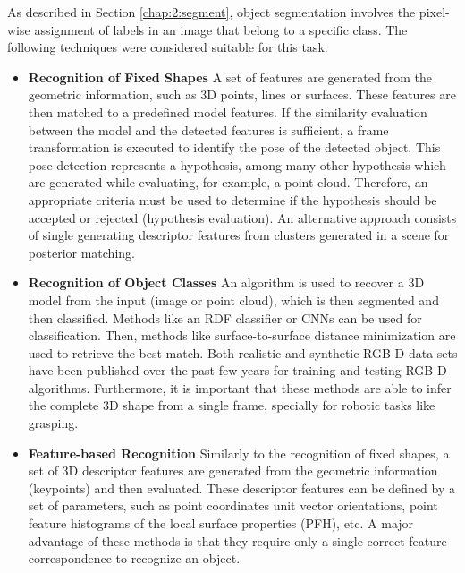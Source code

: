As described in Section \ref{chap:2:segment}, object segmentation involves the pixel-wise assignment of labels in an image that belong to a specific class. The following techniques were considered suitable for this task:
\begin{itemize}
    \item \textbf{Recognition of Fixed Shapes} A set of features are generated from the geometric information, such as 3D points, lines or surfaces. These features are then matched to a predefined model features. If the similarity evaluation between the model and the detected features is sufficient, a frame transformation is executed to identify the pose of the detected object. This pose detection represents a hypothesis, among many other hypothesis which are generated while evaluating, for example, a point cloud. Therefore, an appropriate criteria must be used to determine if the hypothesis should be accepted or rejected (hypothesis evaluation). An alternative approach consists of single generating descriptor features from clusters generated in a scene for posterior matching.
    
    \item \textbf{Recognition of Object Classes} An algorithm is used to recover a 3D model from the input (image or point cloud), which is then segmented and then classified. Methods like an RDF classifier or CNNs can be used for classification. Then, methods like surface-to-surface distance minimization are used to retrieve the best match. Both realistic and synthetic RGB-D data sets have been published over the past few years for training and testing RGB-D algorithms. Furthermore, it is important that these methods are able to infer the complete 3D shape from a single frame, specially for robotic tasks like grasping.
    
    \item \textbf{Feature-based Recognition} Similarly to the recognition of fixed shapes, a set of 3D descriptor features are generated from the geometric information (keypoints) and then evaluated. These descriptor features can be defined by a set of  parameters, such as point coordinates unit vector orientations, point feature histograms of the local surface properties (PFH), etc. A major advantage of these methods is that they require only a single correct feature correspondence to recognize an object.
    
\end{itemize}
